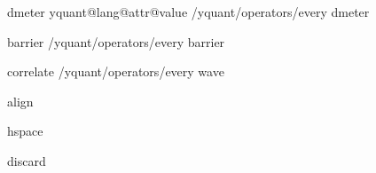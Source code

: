 \yquant@langhelper@declare@command@uncontrolled%
   {dmeter}%
   \yquant@register@get@allowmultitrue%
   {%
      \ifdefined\yquant@lang@attr@type%
         \yquant@register@type@fromstring\yquant@lang@attr@type\yquant@circuit@settype@to%
      \else%
         \let\yquant@circuit@settype@to=\yquant@register@type@c%
      \fi%
      \let\yquant@prepare@callback@prepare=\yquant@circuit@settype@prepare%
      \let\yquant@prepare@callback@draw=\yquant@circuit@settype%
      \unless\ifcsname yquant@lang@attr@value\endcsname%
         \let\yquant@lang@attr@value=\empty%
      \fi%
      \expandafter\yquant@prepare%
         \expandafter{\yquant@lang@attr@value}%
         {/yquant/operators/every dmeter}%
   }

\yquant@langhelper@declare@command@uncontrolled%
   {barrier}%
   \yquant@register@get@allowmultitrue%
   {%
      \yquant@prepare%
         {}%
         {/yquant/operators/every barrier}%
   }%

\yquant@langhelper@declare@command@uncontrolled%
   {correlate}%
   {%
      \yquant@register@get@allowmultitrue%
      \let\yquant@register@multi@splitparts=\yquant@register@multi@splitparts@sepall%
   }{%
      \yquant@prepare%
         {}%
         {/yquant/operators/every wave}%
   }

\yquant@langhelper@declare@command@uncontrolled%
   {align}%
   {}%
   {%
      \yquant@circuit@align\yquant@circuit@operator@targets%
   }

\yquant@langhelper@declare@command@uncontrolled%
   {hspace}%
   {%
      \yquant@langhelper@validate\amount\dimen\yquant@lang@attr@value%
   }{%
      \yquant@circuit@hspace\yquant@circuit@operator@targets\amount%
   }

\yquant@langhelper@declare@command@uncontrolled%
   {discard}%
   {}%
   {%
      \let\yquant@circuit@settype@to=\yquant@register@type@none%
      \yquant@circuit@actonwires%
         \yquant@circuit@settype@prepare%
         \yquant@circuit@settype%
         \yquant@circuit@operator@targets%
         {}%
   }

